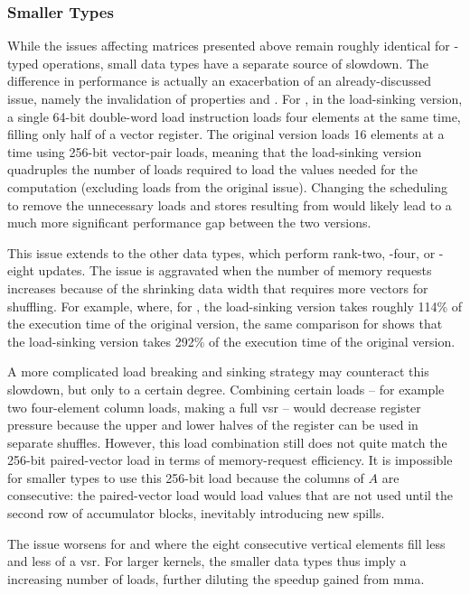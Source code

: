 \documentclass[\main/thesis.tex]{subfiles}
\begin{document}
\subsubsection{Smaller Types}
While the issues affecting  matrices presented above remain roughly identical for -typed operations, small data types have a separate source of slowdown.
The difference in performance is actually an exacerbation of an already-discussed issue, namely the invalidation of properties  and .
For , in the load-sinking version, a single 64-bit double-word load instruction loads four  elements at the same time, filling only half of a vector register.
The original version loads 16 elements at a time using 256-bit vector-pair loads, meaning that the load-sinking version quadruples the number of loads required to load the values needed for the computation (excluding loads from the original  issue).
Changing the scheduling to remove the unnecessary loads and stores resulting from  would likely lead to a much more significant performance gap between the two versions.

This issue extends to the other data types, which perform rank-two, -four, or -eight updates.
The issue is aggravated when the number of memory requests increases because of the shrinking data width that requires more vectors for shuffling.
For example, where, for , the load-sinking version takes roughly 114\% of the execution time of the original version, the same comparison for  shows that the load-sinking version takes 292\% of the execution time of the original version.

A more complicated load breaking and sinking strategy may counteract this slowdown, but only to a certain degree.
Combining certain loads -- for example two four-element  column loads, making a full \gls{vsr} -- would decrease register pressure because the upper and lower halves of the register can be used in separate shuffles.
However, this load combination still does not quite match the 256-bit paired-vector load in terms of memory-request efficiency.
It is impossible for smaller types to use this 256-bit load because the columns of $A$ are consecutive: the paired-vector load would load values that are not used until the second row of accumulator blocks, inevitably introducing new \glspl{spill}.

The issue worsens for  and  where the eight consecutive vertical elements fill less and less of a \gls{vsr}.
For larger kernels, the smaller data types thus imply a increasing number of loads, further diluting the speedup gained from \gls{mma}.
\end{document}
